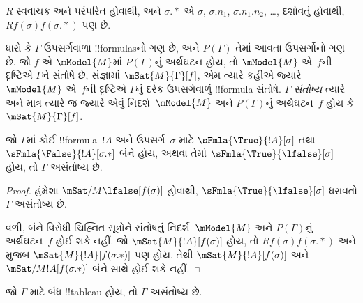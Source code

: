 \documentclass[../../../include/open-logic-section]{subfiles}
\begin{document}
$R$ સ્વવાચક અને પરંપરિત હોવાથી, અને $\sigma.{*}$
એ $\sigma$, $\sigma.n_1$, $\sigma.n_1.n_2$,
\dots, દર્શાવતું હોવાથી, $Rf(\sigma)f(\sigma.{*})$
પણ છે.

\begin{defn}
  ધારો કે $\Gamma$ ઉપસર્ગવાળા !!{formula}sનો ગણ છે,
  અને $P(\Gamma)$ તેમાં આવતા ઉપસર્ગોનો ગણ છે.
  જો $f$ એ $\mModel{M}$માં $P(\Gamma)$નું અર્થઘટન
  હોય, તો $\mModel{M}$ એ~$f$ની દૃષ્ટિએ $\Gamma$ને
  સંતોષે છે, સંજ્ઞામાં $\mSat{M}{\Gamma}[f]$,
  એમ ત્યારે કહીએ જ્યારે $\mModel{M}$ એ~$f$ની
  દૃષ્ટિએ $\Gamma$નું દરેક ઉપસર્ગવાળું !!{formula}
  સંતોષે. $\Gamma$ \emph{સંતોષ્ય} ત્યારે અને માત્ર
  ત્યારે જ જ્યારે એવું નિદર્શ~$\mModel{M}$ અને
  $P(\Gamma)$નું અર્થઘટન~$f$ હોય કે
  $\mSat{M}{\Gamma}[f]$.
\end{defn}

\begin{prop}
  જો $\Gamma$માં કોઈ !!{formula}~$!A$ અને
  ઉપસર્ગ~$\sigma$ માટે
  $\sFmla{\True}{!A}[\sigma]$ તથા
  $\sFmla{\False}{!A}[\sigma.{*}]$ બંને હોય,
  અથવા તેમાં $\sFmla{\True}{\lfalse}[\sigma]$
  હોય, તો $\Gamma$ અસંતોષ્ય છે.
\end{prop}

\begin{proof}
  હંમેશા $\mSat/{M}{\lfalse}[f(\sigma)]$ હોવાથી,
  $\sFmla{\True}{\lfalse}[\sigma]$ ધરાવતો
  $\Gamma$ અસંતોષ્ય છે.

  વળી, બંને વિરોધી ચિહ્નિત સૂત્રોને સંતોષતું
  નિદર્શ~$\mModel{M}$ અને $P(\Gamma)$નું અર્થઘટન~$f$
  હોઈ શકે નહીં. જો $\mSat{M}{!A}[f(\sigma)]$
  હોય, તો $Rf(\sigma)f(\sigma.{*})$ અને
   મુજબ
  $\mSat{M}{!A}[f(\sigma.{*})]$ પણ હોય.
  તેથી $\mSat{M}{!A}[f(\sigma)]$ અને
  $\mSat/{M}{!A}[f(\sigma.{*})]$ બંને સાથે
  હોઈ શકે નહીં.
\end{proof}

\begin{thm}[યથાર્થતા]
  જો $\Gamma$ માટે બંધ !!{tableau} હોય,
  તો $\Gamma$ અસંતોષ્ય છે.
\end{thm}
\end{document}
